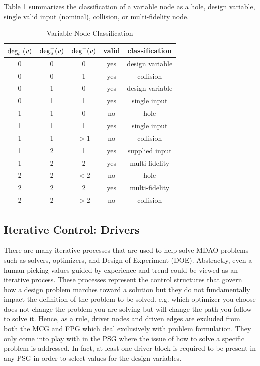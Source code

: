 Table \ref{t:variable node classification} summarizes the classification of a variable 
node as a hole, design variable, single valid input (nominal), collision, or 
multi-fidelity node.

\begin{table}[htbp]
  \centering
  \caption{Variable Node Classification}
    \begin{tabular}{ccccc}
    \toprule
    $\textrm{deg}^-_l(v)$ & $\textrm{deg}^-_u(v)$ & $\textrm{deg}^-(v)$ & valid & classification \\
    \midrule
    0     & 0     & 0     & yes   & design variable \\
    0     & 0     & 1     & yes   & collision \\
    0     & 1     & 0     & yes   & design variable \\
    0     & 1     & 1     & yes   & single input \\
    1     & 1     & 0     & no    & hole \\
    1     & 1     & 1     & yes   & single input \\
    1     & 1     & $>1$ & no    & collision \\
    1     & 2     & 1     & yes   & supplied input \\
    1     & 2     & 2     & yes   & multi-fidelity \\
    2     & 2     & $<2$ & no    & hole \\
    2     & 2     & 2     & yes   & multi-fidelity \\
    2     & 2     & $>2$     & no   & collision \\
    \bottomrule
    \end{tabular}%
  \label{t:variable node classification}%
\end{table}%


\subsection{Iterative Control: Drivers}
  There are many iterative processes that are used to help solve MDAO problems such as 
  solvers, optimizers, and Design of Experiment (DOE). Abstractly, even a human picking 
  values guided by experience and trend could be viewed as an iterative process. 
  These processes represent the control structures that govern how a design problem 
  marches toward a solution but they do not fundamentally impact the definition of the 
  problem to be solved. e.g. which optimizer you choose does not change the problem you 
  are solving but will change the path you follow to solve it. Hence, as a rule, driver 
  nodes and driven edges are excluded from both the MCG and FPG which deal exclusively 
  with problem formulation. They only come into play with in the PSG where the issue of 
  how to solve a specific problem is addressed. In fact, at least one driver block is 
  required to be present in any PSG in order to select values for the design variables. 





